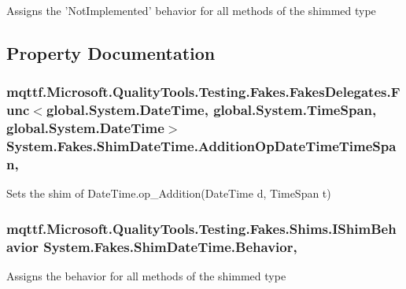 Assigns the 'Not\-Implemented' behavior for all methods of the shimmed type



\subsection{Property Documentation}
\hypertarget{class_system_1_1_fakes_1_1_shim_date_time_a9def4e2d5592498d706fdfe3a7666f74}{
\subsubsection[{Addition\-Op\-Date\-Time\-Time\-Span}]{\setlength{\rightskip}{0pt plus 5cm}mqttf.\-Microsoft.\-Quality\-Tools.\-Testing.\-Fakes.\-Fakes\-Delegates.\-Func$<$global.\-System.\-Date\-Time, global.\-System.\-Time\-Span, global.\-System.\-Date\-Time$>$ System.\-Fakes.\-Shim\-Date\-Time.\-Addition\-Op\-Date\-Time\-Time\-Span\hspace{0.3cm}{\ttfamily [static]}, {\ttfamily [set]}}}\label{class_system_1_1_fakes_1_1_shim_date_time_a9def4e2d5592498d706fdfe3a7666f74}


Sets the shim of Date\-Time.\-op\-\_\-\-Addition(\-Date\-Time d, Time\-Span t)

\hypertarget{class_system_1_1_fakes_1_1_shim_date_time_ac8d7cde7ba6c80ba03f7882e021a540c}{
\subsubsection[{Behavior}]{\setlength{\rightskip}{0pt plus 5cm}mqttf.\-Microsoft.\-Quality\-Tools.\-Testing.\-Fakes.\-Shims.\-I\-Shim\-Behavior System.\-Fakes.\-Shim\-Date\-Time.\-Behavior\hspace{0.3cm}{\ttfamily [static]}, {\ttfamily [set]}}}\label{class_system_1_1_fakes_1_1_shim_date_time_ac8d7cde7ba6c80ba03f7882e021a540c}


Assigns the behavior for all methods of the shimmed type

